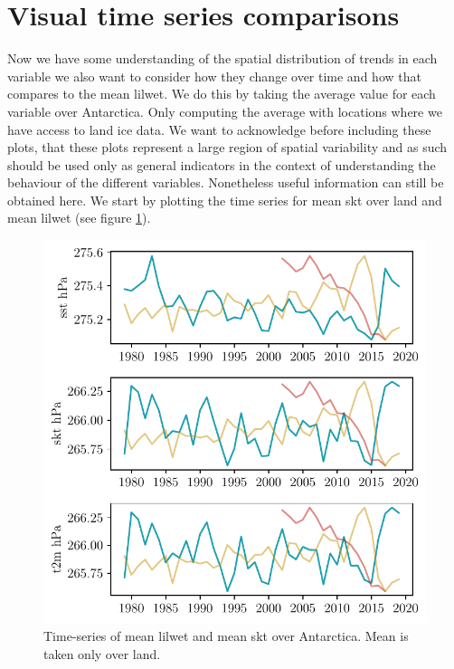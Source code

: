 \documentclass[../main.tex]{subfiles}
\begin{document}
\FloatBarrier
\section{Visual time series comparisons}
Now we have some understanding of the spatial distribution of trends in each variable we also want to consider how they change over time and how that compares to the mean \gls{lilwet}. We do this by taking the average value for each variable over Antarctica. Only computing the average with locations where we have access to land ice data. We want to acknowledge before including these plots, that these plots represent a large region of spatial variability and as such should be used only as general indicators in the context of understanding the behaviour of the different variables. Nonetheless useful information can still be obtained here. We start by plotting the time series for mean \gls{skt} over land and mean \gls{lilwet} (see figure \ref{fig:timeseries_skt}).

\begin{figure}[hbt!]
    \centering
    \includegraphics{images/T2/timeseries_subplots/hres/temperature}
    \caption{Time-series of mean \gls{lilwet} and mean \gls{skt} over Antarctica. Mean is taken only over land.}
    \label{fig:timeseries_skt}
\end{figure}
\end{document}

